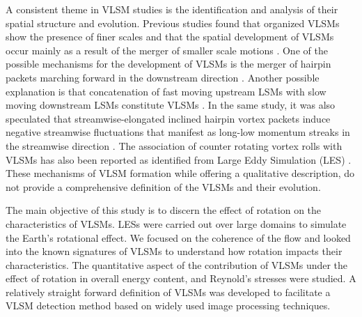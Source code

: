 \documentclass{amsart}
\begin{document}

 
A consistent theme in VLSM studies is the identification and analysis of their spatial structure and evolution. Previous studies found that organized  VLSMs show the presence of finer scales and that the spatial development of VLSMs occur mainly as a result of the merger of smaller scale motions \citep{Lee_sung_jfm11,baltzer_jfm_13,lee_sung_jfm_14}. One of the possible mechanisms for the development of VLSMs is the merger of  hairpin packets marching forward in the downstream direction \citep{Lee_sung_jfm11}. Another possible  explanation is that concatenation of fast moving upstream LSMs with slow moving downstream LSMs constitute VLSMs \citep{lee_sung_jfm_14}. In the same study, it was also speculated that streamwise-elongated inclined hairpin vortex packets induce negative streamwise fluctuations that manifest as long-low momentum streaks in the streamwise direction \citep{lee_sung_jfm_14}. The association of counter rotating vortex rolls with VLSMs has also been reported as identified from Large Eddy Simulation (LES) \citep{fang2015blm}.  These  mechanisms of VLSM formation while offering a qualitative description, do not provide a comprehensive definition of the VLSMs and their evolution.
 
The main objective of this study is to discern the effect of rotation on the characteristics of VLSMs.  LESs were carried out over large domains to simulate the Earth's rotational effect.  We focused on the coherence of the flow and looked into the  known  signatures of VLSMs to understand how rotation impacts their characteristics.  The quantitative aspect of the contribution of VLSMs under the effect of rotation  in overall energy content, and  Reynold's stresses were studied.  A relatively straight forward  definition of VLSMs was developed to facilitate a VLSM detection method based on widely used image processing techniques. 
\end{document}
